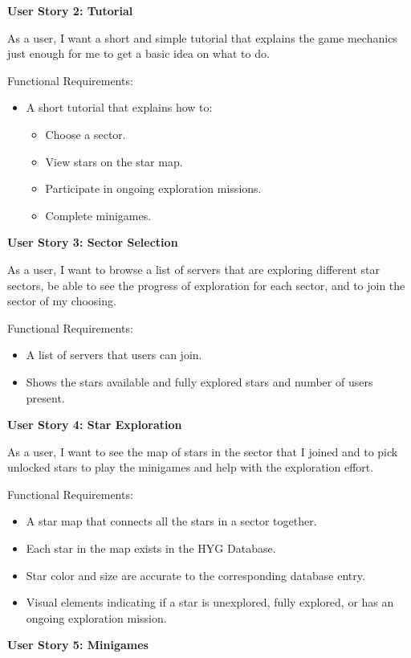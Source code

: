 \textbf{User Story 2: Tutorial}

As a user, I want a short and simple tutorial that explains the game mechanics just enough for me to get a basic idea on what to do.

Functional Requirements:
\begin{itemize}
\item A short tutorial that explains how to:
\begin{itemize}
\item Choose a sector.
\item View stars on the star map.
\item Participate in ongoing exploration missions.
\item Complete minigames.
\end{itemize}
\end{itemize}

\textbf{User Story 3: Sector Selection}

As a user, I want to browse a list of servers that are exploring different star sectors, be able to see the progress of exploration for each sector, and to join the sector of my choosing.

Functional Requirements:
\begin{itemize}
\item A list of servers that users can join.
\item Shows the stars available and fully explored stars and number of users present.
\end{itemize}

\textbf{User Story 4: Star Exploration}

As a user, I want to see the map of stars in the sector that I joined and to pick unlocked stars to play the minigames and help with the exploration effort.

Functional Requirements:
\begin{itemize}
\item A star map that connects all the stars in a sector together.
\item Each star in the map exists in the HYG Database.
\item Star color and size are accurate to the corresponding database entry.
\item Visual elements indicating if a star is unexplored, fully explored, or has an ongoing exploration mission.
\end{itemize}

\textbf{User Story 5: Minigames}

